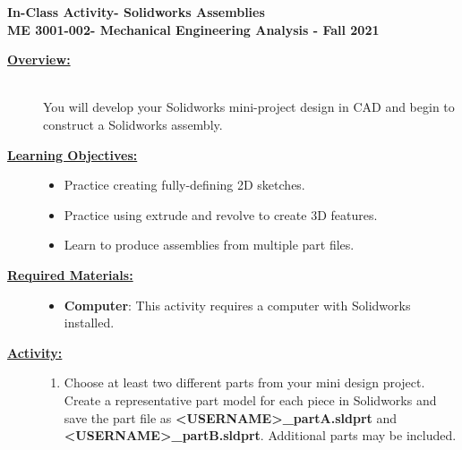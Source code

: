 \documentclass[12pt]{article}
\newcommand{\COURNAME}{ME 3001-002}
\newcommand{\CURRTERM}{Fall 2021} %
\newcommand{\ANUM}{7} %
\newcommand{\activitytitle}{Solidworks Assemblies} %
\begin{document}
\thispagestyle{plain}

\begin{center}
   {\bf \Large In-Class Activity\hspc\ANUM\hspc - \activitytitle}\vspace{3mm}\\
   {\bf \large \COURNAME - Mechanical Engineering Analysis - \CURRTERM} \vspace{5mm}\\
\end{center}

\begin{description}

\item[\textbf{\underline{Overview:}}] \hfill \vspace{3mm}\\
You will develop your Solidworks mini-project design in CAD and begin to construct a Solidworks assembly.

\item[\textbf{\underline{Learning Objectives:}}] \hfill \vspace{0mm}

\begin{itemize}
	\item Practice creating fully-defining 2D sketches.  
	\item Practice using extrude and revolve to create 3D features.
	\item Learn to produce assemblies from multiple part files.
	 
\end{itemize}

\item[\textbf{\underline{Required Materials:}}] \hfill \vspace{0mm}

\begin{itemize}
	\item {\bf Computer}: This activity requires a computer with Solidworks installed.
\end{itemize}

\item[\textbf{\underline{Activity:}}] \hfill \vspace{0mm}

\begin{enumerate}
	

	\item Choose at least two different parts from your mini design project. Create a representative part model for each piece in Solidworks and save the part file as {\bf \BL<USERNAME>\BK\_partA.sldprt} and {\bf \BL<USERNAME>\BK\_partB.sldprt}. Additional parts may be included. 
	 \
	

\end{enumerate}
\end{description}
\end{document}
